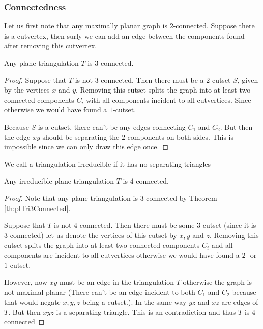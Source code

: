 \subsubsection{Connectedness}
Let us first note that any maximally planar graph is $2$-connected. Suppose there is a cutvertex, then surly we can add an edge between the components found after removing this cutvertex.

\begin{thrm}
  Any plane triangulation $T$ is $3$-connected.
  \label{th:plTri3Connected}
\end{thrm}

\begin{proof}
  Suppose that $T$ is not $3$-connected. Then there must be a $2$-cutset $S$, given by the vertices $x$ and $y$. Removing this cutset splits the graph into at least two connected components $C_i$ with all components incident to all cutvertices. Since otherwise we would have found a $1$-cutset.

  Because $S$ is a cutset, there can't be any edges connecting $C_1$ and $C_2$. But then the edge $xy$ should be separating the $2$ components on both sides. This is impossible since we can only draw this edge once.
\end{proof}

\begin{defi}
We call a triangulation irreducible if it has no separating triangles
\end{defi}


\begin{thrm}
Any irreducible plane triangulation $T$ is $4$-connected.
\end{thrm}

\begin{proof}
Note that any plane triangulation is $3$-connected by Theorem \ref{th:plTri3Connected}.

Suppose that $T$ is not $4$-connected. Then there must be some $3$-cutset (since it is $3$-connected) let us denote the vertices of this cutset by $x, y$ and $z$. Removing this cutset splits the graph into at least two connected components $C_i$ and all components are incident to all cutvertices otherwise we would have found a $2$- or $1$-cutset.

However, now $xy$ must be an edge in the triangulation $T$ otherwise the graph is not maximal planar (There can't be an edge incident to both $C_1$ and $C_2$ because that would negate $x, y ,z$ being a cutset.). In the same way $yz$ and $xz$ are edges of $T$. But then $xyz$ is a separating triangle. This is an contradiction and thus $T$ is $4$-connected
\end{proof}

